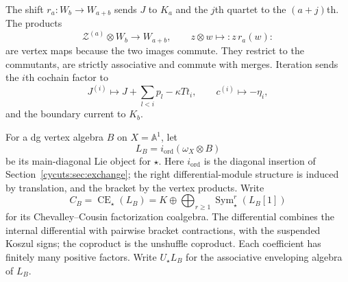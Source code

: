 The shift $r_a:W_b\to W_{a+b}$ sends $J$ to $K_a$ and
the $j$th quartet to the $(a+j)$th. The products
\[
 \mathcal Z^{(a)}\otimes W_b\longrightarrow W_{a+b},
 \qquad z\otimes w\longmapsto{:}z\,r_a(w){:}
\]
are vertex maps because the two images commute. They restrict
to the commutants, are strictly associative and commute with
merges. Iteration sends the $i$th cochain factor to
\begin{equation}\label{cycen:eq:tower-currents}
 J^{(i)}\longmapsto J+\sum_{l<i}p_l-\kappa Tt_i,
 \qquad c^{(i)}\longmapsto-\eta_i,
\end{equation}
and the boundary current to $K_b$.

For a dg vertex algebra $B$ on $X=\mathbb A^1$, let
\[
 L_B=i_{\mathrm{ord}}(\omega_X\otimes B)
\]
be its main-diagonal Lie object for $\star$.
Here $i_{\mathrm{ord}}$ is the diagonal insertion of
Section~\ref{cycuts:sec:exchange}; the right differential-module
structure is induced by translation, and the bracket by the
vertex products. Write
\[
 C_B=\operatorname{CE}_\star(L_B)
     =K\oplus\bigoplus_{r\geq1}
                    \operatorname{Sym}_\star^r(L_B[1])
\]
for its Chevalley--Cousin factorization coalgebra.
The differential combines the internal differential with pairwise
bracket contractions, with the suspended Koszul signs; the
coproduct is the unshuffle coproduct. Each coefficient has
finitely many positive factors. Write $U_\star L_B$ for the
associative enveloping algebra of $L_B$.

